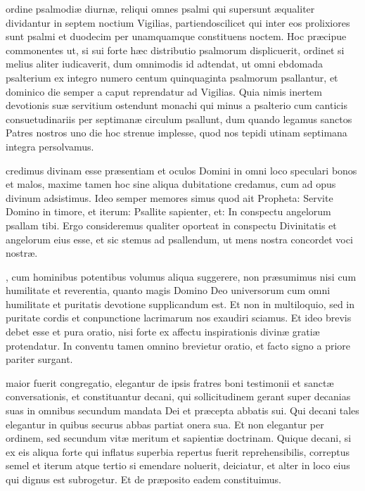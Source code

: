 \documentclass[fontsize=9pt,paper=A6,twoside,BCOR=1mm,DIV=22,headinclude]{scrarticle}
\begin{document}
\begin{multicols}{2}
 ordine psalmodiæ diurnæ, reliqui omnes psalmi qui supersunt æqualiter dividantur in septem noctium Vigilias, partiendoscilicet qui inter eos prolixiores sunt psalmi et duodecim per unamquamque constituens noctem. Hoc præcipue commonentes ut, si sui forte hæc distributio psalmorum displicuerit, ordinet si melius aliter iudicaverit, dum omnimodis id adtendat, ut omni ebdomada psalterium ex integro numero centum quinquaginta psalmorum psallantur, et dominico die semper a caput reprendatur ad Vigilias. Quia nimis inertem devotionis suæ servitium ostendunt monachi qui minus a psalterio cum canticis consuetudinariis per septimanæ circulum psallunt, dum quando legamus sanctos Patres nostros uno die hoc strenue implesse, quod nos tepidi utinam septimana integra persolvamus. 

{
 credimus divinam esse præsentiam et oculos Domini in omni loco speculari bonos et malos, maxime tamen hoc sine aliqua dubitatione credamus, cum ad opus divinum adsistimus. Ideo semper memores simus quod ait Propheta: Servite Domino in timore, et iterum: Psallite sapienter, et: In conspectu angelorum psallam tibi. Ergo consideremus qualiter oporteat in conspectu Divinitatis et angelorum eius esse, et sic stemus ad psallendum, ut mens nostra concordet voci nostræ. 

}

, cum hominibus potentibus volumus aliqua suggerere, non præsumimus nisi cum humilitate et reverentia, quanto magis Domino Deo universorum cum omni humilitate et puritatis devotione supplicandum est. Et non in multiloquio, sed in puritate cordis et conpunctione lacrimarum nos exaudiri sciamus. Et ideo brevis debet esse et pura oratio, nisi forte ex affectu inspirationis divinæ gratiæ protendatur. In conventu tamen omnino brevietur oratio, et facto signo a priore pariter surgant.

 maior fuerit congregatio, elegantur de ipsis fratres boni testimonii et sanctæ conversationis, et constituantur decani, qui sollicitudinem gerant super decanias suas in omnibus secundum mandata Dei et præcepta abbatis sui. Qui decani tales elegantur in quibus securus abbas partiat onera sua. Et non elegantur per ordinem, sed secundum vitæ meritum et sapientiæ doctrinam. Quique decani, si ex eis aliqua forte qui inflatus superbia repertus fuerit reprehensibilis, correptus semel et iterum atque tertio si emendare noluerit, deiciatur, et alter in loco eius qui dignus est subrogetur. Et de præposito eadem constituimus. 


\end{multicols}
\end{document}
